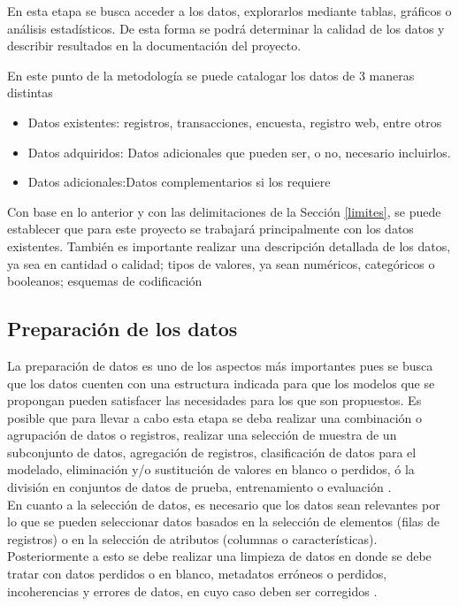 En esta etapa se busca acceder a los datos, explorarlos mediante tablas, gráficos o análisis estadísticos. De esta forma se podrá determinar la calidad de los datos y describir resultados en la documentación del proyecto.

En este punto de la metodología se puede catalogar los datos de 3 maneras distintas
\begin{itemize}
    \item Datos existentes: registros, transacciones, encuesta, registro web, entre otros
    \item Datos adquiridos: Datos adicionales que pueden ser, o no, necesario incluirlos.
    \item Datos adicionales:Datos complementarios si los requiere
\end{itemize}
Con base en lo anterior y con las delimitaciones de la Sección \ref{limites}, se puede establecer que para este proyecto se trabajará principalmente con los datos existentes. También es importante realizar una descripción detallada de los datos, ya sea en cantidad o calidad; tipos de valores, ya sean numéricos, categóricos o booleanos; esquemas de codificación

\subsection{Preparación de los datos}
La preparación de datos es uno de los aspectos más importantes pues se busca que los datos cuenten con una estructura indicada para que los modelos que se propongan pueden satisfacer las necesidades para los que son propuestos. Es posible que para llevar a cabo esta etapa se deba realizar una combinación o agrupación de datos o registros, realizar una selección de muestra de un subconjunto de datos, agregación de registros, clasificación de datos para el modelado, eliminación y/o sustitución de valores en blanco o perdidos, ó la división en conjuntos de datos de prueba, entrenamiento o evaluación \cite{ibmcrisp}.\\

En cuanto a la selección de datos, es necesario que los datos sean relevantes por lo que se pueden seleccionar datos basados en la selección de elementos (filas de registros) o en la selección de atributos (columnas o características). Posteriormente a esto se debe realizar una limpieza de datos en donde se debe tratar con datos perdidos o en blanco, metadatos erróneos o perdidos, incoherencias y errores de datos, en cuyo caso deben ser corregidos \cite{ibmcrisp}.




